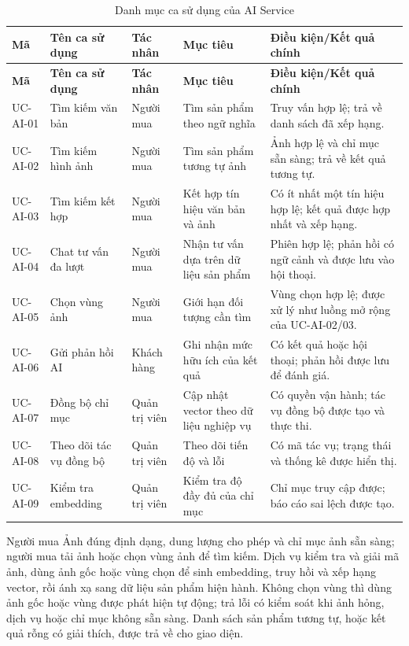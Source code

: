 \begin{longtable}{|p{}|p{}|p{}|p{}|p{}|}
    \caption{Danh mục ca sử dụng của AI Service}\label{tab:usecase-ai-summary}\\
    \hline
    \textbf{Mã} & \textbf{Tên ca sử dụng} & \textbf{Tác nhân} & \textbf{Mục tiêu} & \textbf{Điều kiện/Kết quả chính} \\ \hline
    \endfirsthead
    \hline
    \textbf{Mã} & \textbf{Tên ca sử dụng} & \textbf{Tác nhân} & \textbf{Mục tiêu} & \textbf{Điều kiện/Kết quả chính} \\ \hline
    \endhead
    UC-AI-01 & Tìm kiếm văn bản & Người mua & Tìm sản phẩm theo ngữ nghĩa & Truy vấn hợp lệ; trả về danh sách đã xếp hạng. \\ \hline
    UC-AI-02 & Tìm kiếm hình ảnh & Người mua & Tìm sản phẩm tương tự ảnh & Ảnh hợp lệ và chỉ mục sẵn sàng; trả về kết quả tương tự. \\ \hline
    UC-AI-03 & Tìm kiếm kết hợp & Người mua & Kết hợp tín hiệu văn bản và ảnh & Có ít nhất một tín hiệu hợp lệ; kết quả được hợp nhất và xếp hạng. \\ \hline
    UC-AI-04 & Chat tư vấn đa lượt & Người mua & Nhận tư vấn dựa trên dữ liệu sản phẩm & Phiên hợp lệ; phản hồi có ngữ cảnh và được lưu vào hội thoại. \\ \hline
    UC-AI-05 & Chọn vùng ảnh & Người mua & Giới hạn đối tượng cần tìm & Vùng chọn hợp lệ; được xử lý như luồng mở rộng của UC-AI-02/03. \\ \hline
    UC-AI-06 & Gửi phản hồi AI & Khách hàng & Ghi nhận mức hữu ích của kết quả & Có kết quả hoặc hội thoại; phản hồi được lưu để đánh giá. \\ \hline
    UC-AI-07 & Đồng bộ chỉ mục & Quản trị viên & Cập nhật vector theo dữ liệu nghiệp vụ & Có quyền vận hành; tác vụ đồng bộ được tạo và thực thi. \\ \hline
    UC-AI-08 & Theo dõi tác vụ đồng bộ & Quản trị viên & Theo dõi tiến độ và lỗi & Có mã tác vụ; trạng thái và thống kê được hiển thị. \\ \hline
    UC-AI-09 & Kiểm tra embedding & Quản trị viên & Kiểm tra độ đầy đủ của chỉ mục & Chỉ mục truy cập được; báo cáo sai lệch được tạo. \\ \hline
\end{longtable}

{Người mua}
{Ảnh đúng định dạng, dung lượng cho phép và chỉ mục ảnh sẵn sàng; người mua tải ảnh hoặc chọn vùng ảnh để tìm kiếm.}
{Dịch vụ kiểm tra và giải mã ảnh, dùng ảnh gốc hoặc vùng chọn để sinh embedding, truy hồi và xếp hạng vector, rồi ánh xạ sang dữ liệu sản phẩm hiện hành.}
{Không chọn vùng thì dùng ảnh gốc hoặc vùng được phát hiện tự động; trả lỗi có kiểm soát khi ảnh hỏng, dịch vụ hoặc chỉ mục không sẵn sàng.}
{Danh sách sản phẩm tương tự, hoặc kết quả rỗng có giải thích, được trả về cho giao diện.}

